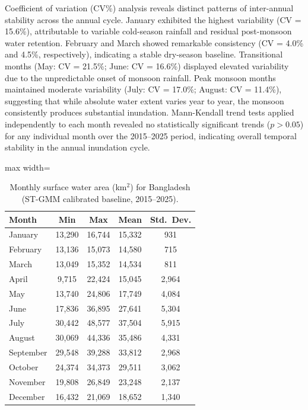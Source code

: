 \documentclass[fleqn,10pt,twocolumn]{article}
\begin{document}
Coefficient of variation (CV\%) analysis reveals distinct patterns of inter-annual stability across the annual cycle. January exhibited the highest variability (CV = 15.6\%), attributable to variable cold-season rainfall and residual post-monsoon water retention. February and March showed remarkable consistency (CV = 4.0\% and 4.5\%, respectively), indicating a stable dry-season baseline. Transitional months (May: CV = 21.5\%; June: CV = 16.6\%) displayed elevated variability due to the unpredictable onset of monsoon rainfall. Peak monsoon months maintained moderate variability (July: CV = 17.0\%; August: CV = 11.4\%), suggesting that while absolute water extent varies year to year, the monsoon consistently produces substantial inundation. Mann-Kendall trend tests applied independently to each month revealed no statistically significant trends ($p > 0.05$) for any individual month over the 2015--2025 period, indicating overall temporal stability in the annual inundation cycle.

\begin{table}[htbp]
\centering
\caption{Monthly surface water area (km$^{2}$) for Bangladesh (ST-GMM calibrated baseline, 2015--2025).}
\label{tab:monthly_water}
\begin{adjustbox}{max width=\linewidth}\begin{tabular}{lcccc}
\toprule
\textbf{Month} & \textbf{Min} & \textbf{Max} & \textbf{Mean} & \textbf{Std.\ Dev.} \\
\midrule
January   & 13,290 & 16,744 & 15,332 & 931 \\
February  & 13,136 & 15,073 & 14,580 & 715 \\
March     & 13,049 & 15,352 & 14,534 & 811 \\
April     & 9,715  & 22,424 & 15,045 & 2,964 \\
May       & 13,740 & 24,806 & 17,749 & 4,084 \\
June      & 17,836 & 36,895 & 27,641 & 5,304 \\
July      & 30,442 & 48,577 & 37,504 & 5,915 \\
August    & 30,069 & 44,336 & 35,486 & 4,331 \\
September & 29,548 & 39,288 & 33,812 & 2,968 \\
October   & 24,374 & 34,373 & 29,511 & 3,062 \\
November  & 19,808 & 26,849 & 23,248 & 2,137 \\
December  & 16,432 & 21,069 & 18,652 & 1,340 \\
\bottomrule
\end{tabular}\end{adjustbox}
\end{table}
\end{document}
